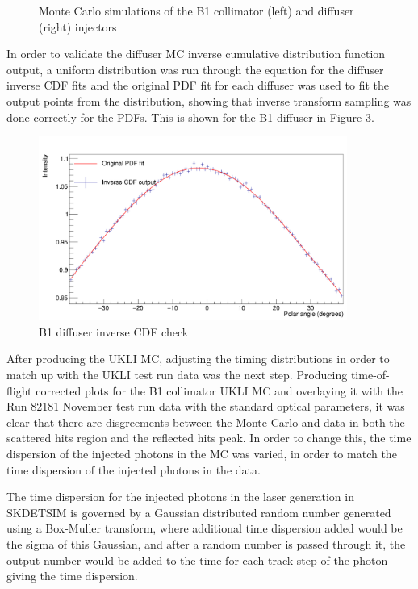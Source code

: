 \begin{figure}[htp]
\begin{subfigure}{0.49\columnwidth}
    \label{fig:ukli_mc_diff}
    \end{subfigure}
    \caption{Monte Carlo simulations of the B1 collimator (left) and diffuser (right) injectors}
    \label{fig:ukli_mc_diff_coll}
\end{figure}

In order to validate the diffuser MC inverse cumulative distribution function output, a uniform distribution was run through the equation for the diffuser inverse CDF fits and the original PDF fit for each diffuser was used to fit the output points from the distribution, showing that inverse transform sampling was done correctly for the PDFs. This is shown for the B1 diffuser in Figure \ref{fig:inv_cdf_check}. 

\begin{figure}
    \centering
    \includegraphics[width=0.9\textwidth]{Figures/inv_cdf_check_diff_B1.PNG}
    \caption{B1 diffuser inverse CDF check}
    \label{fig:inv_cdf_check}
\end{figure}


After producing the UKLI MC, adjusting the timing distributions in order to match up with the UKLI test run data was the next step. Producing time-of-flight corrected plots for the B1 collimator UKLI MC and overlaying it with the Run 82181 November test run data with the standard optical parameters, it was clear that there are disgreements between the Monte Carlo and data in both the scattered hits region and the reflected hits peak. In order to change this, the time dispersion of the injected photons in the MC was varied, in order to match the time dispersion of the injected photons in the data.

The time dispersion for the injected photons in the laser generation in SKDETSIM is governed by a Gaussian distributed random number generated using a Box-Muller transform, where additional time dispersion added would be the sigma of this Gaussian, and after a random number is passed through it, the output number would be added to the time for each track step of the photon giving the time dispersion.

